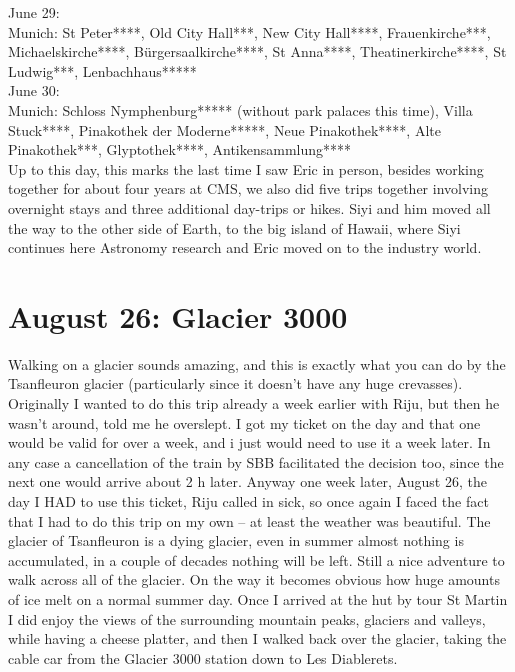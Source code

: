 June 29:\\
Munich: St Peter****, Old City Hall***, New City Hall****, Frauenkirche***, Michaelskirche****, B\"urgersaalkirche****, St Anna****, Theatinerkirche****, St Ludwig***, Lenbachhaus*****\\

June 30:\\
Munich: Schloss Nymphenburg***** (without park palaces this time), Villa Stuck****, Pinakothek der Moderne*****, Neue Pinakothek****, Alte Pinakothek***, Glyptothek****, Antikensammlung****\\

Up to this day, this marks the last time I saw Eric in person, besides working together for about four years at CMS, we also did five trips together involving overnight stays and three additional day-trips or hikes. Siyi and him moved all the way to the other side of Earth, to the big island of Hawaii, where Siyi continues here Astronomy research and Eric moved on to the industry world.\\

\section{August 26: Glacier 3000}
\label{lesdiablerets2017}

Walking on a glacier sounds amazing, and this is exactly what you can do by the Tsanfleuron glacier (particularly since it doesn't have any huge crevasses). Originally I wanted to do this trip already a week earlier with Riju, but then he wasn't around, told me he overslept. I got my ticket on the day and that one would be valid for over a week, and i just would need to use it a week later. In any case a cancellation of the train by SBB facilitated the decision too, since the next one would arrive about 2 h later. Anyway one week later, August 26, the day I HAD to use this ticket, Riju called in sick, so once again I faced the fact that I had to do this trip on my own -- at least the weather was beautiful. The glacier of Tsanfleuron is a dying glacier, even in summer almost nothing is accumulated, in a couple of decades nothing will be left. Still a nice adventure to walk across all of the glacier. On the way it becomes obvious how huge amounts of ice melt on a normal summer day. Once I arrived at the hut by tour St Martin I did enjoy the views of the surrounding mountain peaks, glaciers and valleys, while having a cheese platter, and then I walked back over the glacier, taking the cable car from the Glacier 3000 station down to Les Diablerets.

